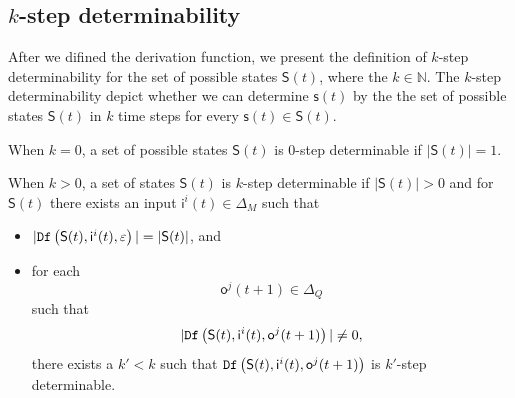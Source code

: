 \subsection{$k$-step determinability}
After we difined the derivation function, we present the definition of $k$-step determinability for the set of possible states $\mathsf{S}(t)$, where the $k\in \mathbb{N}$. The $k$-step determinability depict whether we can determine $\mathsf{s}(t)$ by the the set of possible states $\mathsf{S}(t)$ in $k$ time steps for every $\mathsf{s}(t) \in \mathsf{S}(t)$.%
\begin{definition} 

When $k=0$, a set of possible states $\mathsf{S}(t)$ is $0$-step determinable if $|\mathsf{S}(t)|=1$. 

When $k>0$, a set of states $\mathsf{S}(t)$ is $k$-step determinable
 if $|\mathsf{S}(t)|>0$ and for $\mathsf{S}(t)$ there exists an input $\mathsf{i}^{i}(t) \in \Delta_M$ such that
 \begin{itemize}
 \item  $|{\tt Df}\left(\mathsf{S}(t),\mathsf{i}^{i}(t),\varepsilon\right)|=|\mathsf{S}(t)|$, and 
 \item  for each \[\mathsf{o}^{j}(t+1)\in \Delta_Q\] such that \[|{\tt Df}\left(\mathsf{S}(t),\mathsf{i}^{i}(t),\mathsf{o}^{j}(t+1)\right)|\neq 0,\] there exists a ${k'}<k$ such that ${\tt Df}\left(\mathsf{S}(t),\mathsf{i}^{i}(t),\mathsf{o}^{j}(t+1)\right)$ is $k'$-step determinable.
 \end{itemize}
\end{definition}

